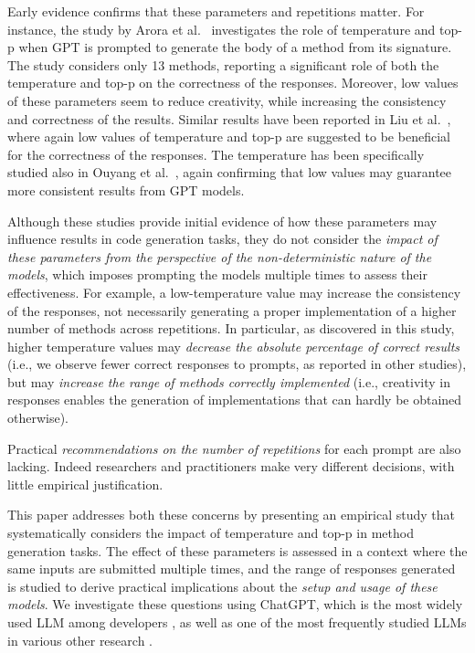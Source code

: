 Early evidence confirms that these parameters and repetitions matter. For instance, the study by Arora et al.~\cite{arora2024optimizing} investigates the role of temperature and top-p when GPT is prompted to generate the body of a method from its signature. The study considers only 13 methods, reporting a significant role of both the temperature and top-p on the correctness of the responses. Moreover, low values of these parameters seem to reduce creativity, while increasing the consistency and correctness of the results. Similar results have been reported in Liu et al.~\cite{liu2024your}, where again low values of temperature and top-p are suggested to be beneficial for the correctness of the responses. The temperature has been specifically studied also in Ouyang et al.~\cite{ouyang2023empirical}, again confirming that low values may guarantee more consistent results from GPT models.  

Although these studies provide initial evidence of how these parameters may influence results in code generation tasks, they do not consider the \emph{impact of these parameters from the perspective of the non-deterministic nature of the models}, which imposes prompting the models multiple times to assess their effectiveness. For example, a low-temperature value may increase the consistency of the responses, not necessarily generating a proper implementation of a higher number of methods across repetitions. In particular, as discovered in this study, higher temperature values may \emph{decrease the absolute percentage of correct results} (i.e., we observe fewer correct responses to prompts, as reported in other studies), but may \emph{increase the range of methods correctly implemented} (i.e., creativity in responses enables the generation of implementations that can hardly be obtained otherwise). 

Practical \emph{recommendations on the number of repetitions} for each prompt are also lacking. Indeed researchers and practitioners make very different decisions, with little empirical justification. 

This paper addresses both these concerns by presenting an empirical study that systematically considers the impact of temperature and top-p in method generation tasks. The effect of these parameters is assessed in a context where the same inputs are submitted multiple times, and the range of responses generated is studied to derive practical implications about the \emph{setup and usage of these models}. We investigate these questions using ChatGPT, 
which is the most widely used LLM among developers \cite{MostUsedAI}, as well as one of the most frequently studied LLMs in various other research \cite{liu2024your,ouyang2023empirical,Yihong:CodeGenerationChatGPT:TOSEM:2024,Siddiq:QualityCghatGPT:2024:MSR,Yue:RefiningChatGPTGeneratedCode:TOSEM:2024,10.1145/3643991.3644918}.

